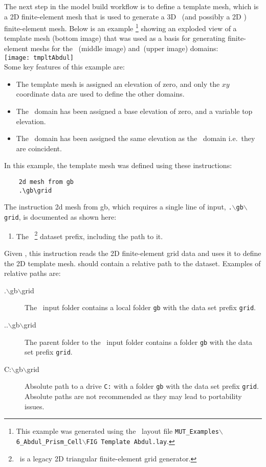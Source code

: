 \label{texfile:TemplateMesh}
The next step in the model build workflow is to define a template mesh, which is a 2D finite-element mesh that is used to generate a 3D \gwf\ (and possibly a 2D \swf) finite-element mesh.   Below is an example
\footnote{This example was generated using the \tecplot\ layout file \texttt{MUT\_Examples$\backslash$6\_Abdul\_Prism\_Cell$\backslash$FIG Template Abdul.lay}. }
  showing an exploded view of a template mesh (bottom image) that was used as a basis for generating  finite-element meshs for the \gwf\ (middle image) and\swf\ (upper image) domains:
    \vspace{.2in} \\
    \texttt{[image: tmpltAbdul]}
    \vspace{.2in} \\
Some key features of this example are:
\begin{itemize}
  \item The template mesh is assigned an elevation of zero, and only the $xy$ coordinate data are used to define the other domains.
  \item The \gwf\ domain has been assigned a base elevation of zero, and a variable top elevation.
  \item The \swf\ domain has been assigned the same elevation as the \gwf\ domain i.e.\ they are coincident.
\end{itemize}

\pagebreak
 In this example, the template mesh was defined using these instructions:
 \squish
\begin{verbatim}
    2d mesh from gb
    .\gb\grid
\end{verbatim}
The instruction \textsf{2d mesh from gb}, which requires a single line of input, \texttt{.$\backslash$gb$\backslash$grid}, is documented as shown here:

    {
        \squish
        \begin{enumerate}
        \item {}  The \gb\ \footnote{\gb\ is a legacy 2D triangular finite-element grid generator.} dataset prefix, including the path to it.
        \end{enumerate}
        Given , this instruction reads the 2D finite-element grid data and uses it to define the 2D template mesh.   should contain a relative path to the dataset.  Examples of relative paths are:
        \begin{description}
        \item[.$\backslash$gb$\backslash$grid] The \mut\ input folder contains a local folder \texttt{gb} with the data set prefix \texttt{grid}.
        \item[..$\backslash$gb$\backslash$grid] The parent folder to the \mut\ input folder contains a folder \texttt{gb} with the data set prefix \texttt{grid}.
        \item[C:$\backslash$gb$\backslash$grid] Absolute path to a drive \texttt{C:} with a folder \texttt{gb} with the data set prefix \texttt{grid}.  Absolute paths are not recommended as they may lead to portability issues.
        \end{description}
        \squish
    }

